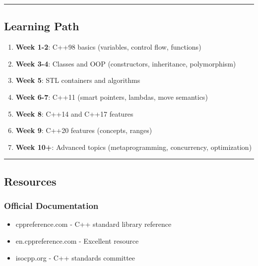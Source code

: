 \begin{center}\rule{0.5\linewidth}{0.5pt}\end{center}

\hypertarget{learning-path}{%
\subsection{Learning Path}\label{learning-path}}

\begin{enumerate}
\def\labelenumi{\arabic{enumi}.}
\tightlist
\item
  \textbf{Week 1-2}: C++98 basics (variables, control flow, functions)
\item
  \textbf{Week 3-4}: Classes and OOP (constructors, inheritance,
  polymorphism)
\item
  \textbf{Week 5}: STL containers and algorithms
\item
  \textbf{Week 6-7}: C++11 (smart pointers, lambdas, move semantics)
\item
  \textbf{Week 8}: C++14 and C++17 features
\item
  \textbf{Week 9}: C++20 features (concepts, ranges)
\item
  \textbf{Week 10+}: Advanced topics (metaprogramming, concurrency,
  optimization)
\end{enumerate}

\begin{center}\rule{0.5\linewidth}{0.5pt}\end{center}

\hypertarget{resources}{%
\subsection{Resources}\label{resources}}

\hypertarget{official-documentation}{%
\subsubsection{Official Documentation}\label{official-documentation}}

\begin{itemize}
\tightlist
\item
  cppreference.com - C++ standard library reference
\item
  en.cppreference.com - Excellent resource
\item
  isocpp.org - C++ standards committee
\end{itemize}


